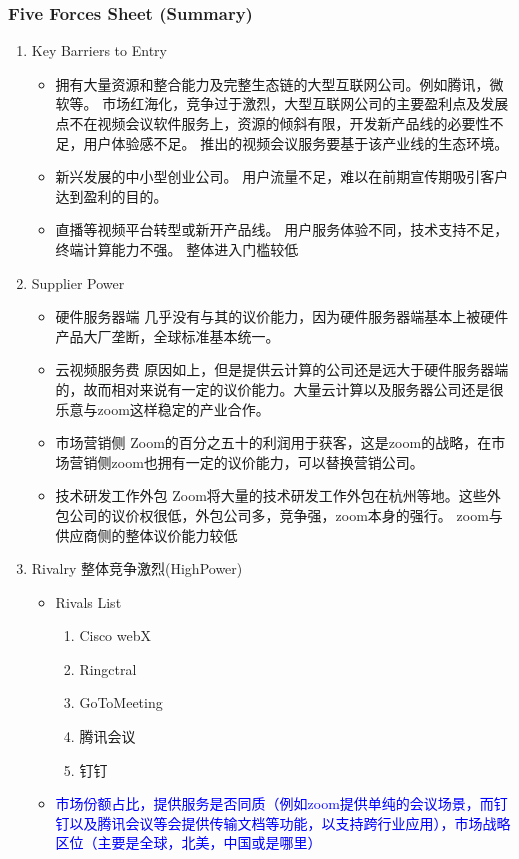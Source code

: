 \documentclass{beamer}
\begin{document}
\begin{frame}[allowframebreaks]
\frametitle{Five Forces Sheet (Summary)}
\begin{enumerate}
    \item Key Barriers to Entry
    \begin{itemize}
        \item 拥有大量资源和整合能力及完整生态链的大型互联网公司。例如腾讯，微软等。
        市场红海化，竞争过于激烈，大型互联网公司的主要盈利点及发展点不在视频会议软件服务上，资源的倾斜有限，开发新产品线的必要性不足，用户体验感不足。
        推出的视频会议服务要基于该产业线的生态环境。
        \item 新兴发展的中小型创业公司。
        用户流量不足，难以在前期宣传期吸引客户达到盈利的目的。
        \item 直播等视频平台转型或新开产品线。
        用户服务体验不同，技术支持不足，终端计算能力不强。
        整体进入门槛较低
    \end{itemize}
    \framebreak
    \item Supplier Power
        \begin{itemize}
            \item 硬件服务器端
            几乎没有与其的议价能力，因为硬件服务器端基本上被硬件产品大厂垄断，全球标准基本统一。
            \item 云视频服务费
            原因如上，但是提供云计算的公司还是远大于硬件服务器端的，故而相对来说有一定的议价能力。大量云计算以及服务器公司还是很乐意与zoom这样稳定的产业合作。
            \item 市场营销侧
            Zoom的百分之五十的利润用于获客，这是zoom的战略，在市场营销侧zoom也拥有一定的议价能力，可以替换营销公司。
            \item 技术研发工作外包
            Zoom将大量的技术研发工作外包在杭州等地。这些外包公司的议价权很低，外包公司多，竞争强，zoom本身的强行。
            zoom与供应商侧的整体议价能力较低
        \end{itemize}  
        \framebreak
    \item Rivalry 整体竞争激烈(HighPower)
    \begin{itemize}
        \item Rivals List \begin{enumerate}
            \item Cisco webX
            \item Ringctral
            \item GoToMeeting
            \item 腾讯会议
            \item 钉钉
        \end{enumerate}
        \item \textcolor{blue}{市场份额占比，提供服务是否同质（例如zoom提供单纯的会议场景，而钉钉以及腾讯会议等会提供传输文档等功能，以支持跨行业应用），市场战略区位（主要是全球，北美，中国或是哪里）}    
    \end{itemize}
    

\end{enumerate}
\end{frame}
\end{document}

